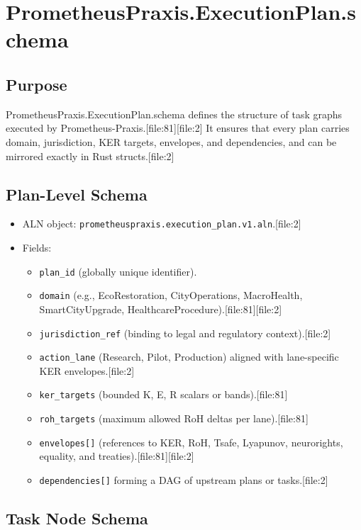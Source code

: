 \documentclass[11pt]{article}
\begin{document}
\section{PrometheusPraxis.ExecutionPlan.schema}

\subsection{Purpose}

PrometheusPraxis.ExecutionPlan.schema defines the structure of task graphs executed by Prometheus-Praxis.[file:81][file:2]
It ensures that every plan carries domain, jurisdiction, KER targets, envelopes, and dependencies, and can be mirrored exactly in Rust structs.[file:2]

\subsection{Plan-Level Schema}

\begin{itemize}[nosep]
  \item ALN object: \texttt{prometheuspraxis.execution\_plan.v1.aln}.[file:2]
  \item Fields:
    \begin{itemize}[nosep]
      \item \texttt{plan\_id} (globally unique identifier).
      \item \texttt{domain} (e.g., EcoRestoration, CityOperations, MacroHealth, SmartCityUpgrade, HealthcareProcedure).[file:81][file:2]
      \item \texttt{jurisdiction\_ref} (binding to legal and regulatory context).[file:2]
      \item \texttt{action\_lane} (Research, Pilot, Production) aligned with lane-specific KER envelopes.[file:2]
      \item \texttt{ker\_targets} (bounded K, E, R scalars or bands).[file:81]
      \item \texttt{roh\_targets} (maximum allowed RoH deltas per lane).[file:81]
      \item \texttt{envelopes[]} (references to KER, RoH, Tsafe, Lyapunov, neurorights, equality, and treaties).[file:81][file:2]
      \item \texttt{dependencies[]} forming a DAG of upstream plans or tasks.[file:2]
    \end{itemize}
\end{itemize}

\subsection{Task Node Schema}
\end{document}
